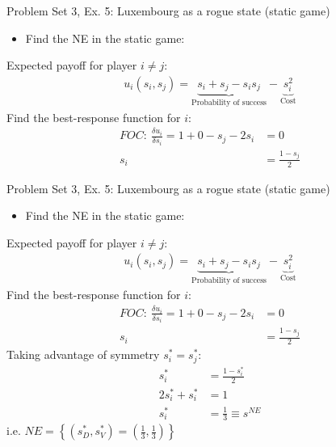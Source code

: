 \begin{frame}{Problem Set 3, Ex. 5: Luxembourg as a rogue state (static game)}
  \begin{multicols}{2}
    \begin{itemize}
      \item[(a)] Find the NE in the static game:
    \end{itemize}
    Expected payoff for player $i\neq j$:
    \begin{align*}
      u_i(s_i,s_j)=\underbrace{s_i+s_j-s_is_j}_\text{Probability of success}-\underbrace{s_i^2}_\text{Cost}
    \end{align*}
    Find the best-response function for $i$:
    \begin{align*}
      FOC:\ \frac{\delta u_i}{\delta s_i}=1+0-s_j-2s_i&=0\\
       s_i&=\frac{1-s_j}{2}
    \end{align*}
  \vfill\null\columnbreak
  \vfill\null
  \end{multicols}
\end{frame}
\begin{frame}{Problem Set 3, Ex. 5: Luxembourg as a rogue state (static game)}
  \begin{multicols}{2}
    \begin{itemize}
      \item[(a)] Find the NE in the static game:
    \end{itemize}
    Expected payoff for player $i\neq j$:
    \begin{align*}
      u_i(s_i,s_j)=\underbrace{s_i+s_j-s_is_j}_\text{Probability of success}-\underbrace{s_i^2}_\text{Cost}
    \end{align*}
    Find the best-response function for $i$:
    \begin{align*}
      FOC:\ \frac{\delta u_i}{\delta s_i}=1+0-s_j-2s_i&=0\\
       s_i&=\frac{1-s_j}{2}
    \end{align*}
    Taking advantage of symmetry $s_i^{*}=s_j^{*}$:
    \begin{align*}
       s_i^{*}&=\frac{1-s_i^{*}}{2}\\
      2s_i^{*}+s_i^{*}&=1\\
       s_i^{*}&=\frac{1}{3}\equiv s^{NE}
    \end{align*}
    i.e. $NE=\left\{(s_D^{*},s_V^{*})=(\frac{1}{3},\frac{1}{3})\right\}$
  \vfill\null\columnbreak
  \vfill\null
  \end{multicols}
\end{frame}
